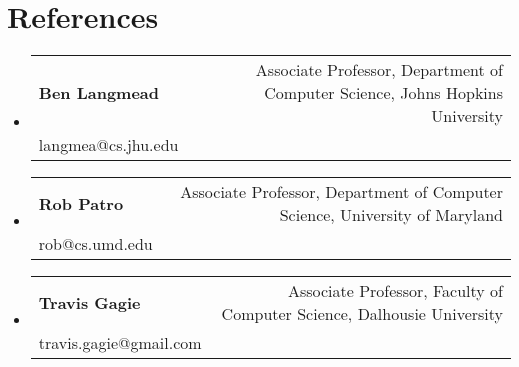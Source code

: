 \documentclass[A4,11pt]{article}
\makeatletter
\newcommand{\CVSubheading}[4]{
  \vspace{-2pt}\item
    \begin{tabular*}{0.97\textwidth}[t]{l@{\extracolsep{\fill}}r}
      \textbf{#1} & #2 \\
      \small#3 & \small #4 \\
    \end{tabular*}\vspace{-7pt}
}
\newcommand{\CVSubHeadingListStart}{\begin{itemize}[leftmargin=0.5cm, label={}]}
\newcommand{\CVSubHeadingListEnd}{\end{itemize}}
\makeatother
\begin{document}
    

\section{References}
\CVSubHeadingListStart
  \CVSubheading
    {Ben Langmead}{Associate Professor, Department of Computer Science, Johns Hopkins University}
    {langmea@cs.jhu.edu}{}
  \CVSubheading
    {Rob Patro}{Associate Professor, Department of Computer Science, University of Maryland}
    {rob@cs.umd.edu}{ }
  \CVSubheading
    {Travis Gagie}{Associate Professor, Faculty of Computer Science, Dalhousie University}
    {travis.gagie@gmail.com}{ }
\CVSubHeadingListEnd
\end{document}
